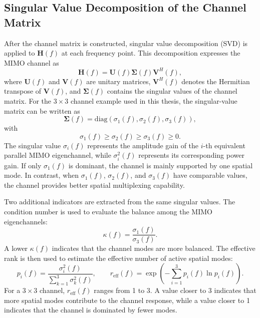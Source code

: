\subsection{Singular Value Decomposition of the Channel Matrix}
After the channel matrix is constructed, singular value decomposition (SVD) is applied to $\mathbf{H}(f)$ at each frequency point. This decomposition expresses the MIMO channel as
\begin{equation}
    \mathbf{H}(f) = \mathbf{U}(f)\mathbf{\Sigma}(f)\mathbf{V}^{H}(f),
\end{equation}
where $\mathbf{U}(f)$ and $\mathbf{V}(f)$ are unitary matrices, $\mathbf{V}^{H}(f)$ denotes the Hermitian transpose of $\mathbf{V}(f)$, and $\mathbf{\Sigma}(f)$ contains the singular values of the channel matrix. For the $3\times3$ channel example used in this thesis, the singular-value matrix can be written as
\begin{equation}
    \mathbf{\Sigma}(f) =
    \mathrm{diag}\left(\sigma_1(f),\sigma_2(f),\sigma_3(f)\right),
\end{equation}
with
\begin{equation}
    \sigma_1(f) \geq \sigma_2(f) \geq \sigma_3(f) \geq 0.
\end{equation}
The singular value $\sigma_i(f)$ represents the amplitude gain of the $i$-th equivalent parallel MIMO eigenchannel, while $\sigma_i^2(f)$ represents its corresponding power gain. If only $\sigma_1(f)$ is dominant, the channel is mainly supported by one spatial mode. In contrast, when $\sigma_1(f)$, $\sigma_2(f)$, and $\sigma_3(f)$ have comparable values, the channel provides better spatial multiplexing capability.

Two additional indicators are extracted from the same singular values. The condition number is used to evaluate the balance among the MIMO eigenchannels:
\begin{equation}
    \kappa(f) = \frac{\sigma_1(f)}{\sigma_3(f)}.
\end{equation}
A lower $\kappa(f)$ indicates that the channel modes are more balanced. The effective rank is then used to estimate the effective number of active spatial modes:
\begin{equation}
    p_i(f) =
    \frac{\sigma_i^2(f)}{\sum_{k=1}^{3}\sigma_k^2(f)},
    \qquad
    r_{\mathrm{eff}}(f) =
    \exp\left(-\sum_{i=1}^{3}p_i(f)\ln p_i(f)\right).
\end{equation}
For a $3\times3$ channel, $r_{\mathrm{eff}}(f)$ ranges from 1 to 3. A value closer to 3 indicates that more spatial modes contribute to the channel response, while a value closer to 1 indicates that the channel is dominated by fewer modes.
